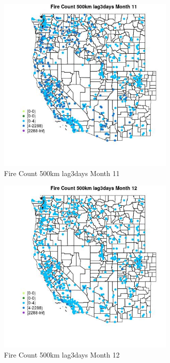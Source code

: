 \begin{figure} 
\centering  
\includegraphics[width=0.77\textwidth]{Code_Outputs/Report_ML_input_PM25_Step4_part_e_de_duplicated_aves_compiled_2019-05-21wNAs_MapObsMo11Fire_Count_500km_lag3days.jpg} 
\caption{\label{fig:Report_ML_input_PM25_Step4_part_e_de_duplicated_aves_compiled_2019-05-21wNAsMapObsMo11Fire_Count_500km_lag3days}Fire Count 500km lag3days Month 11} 
\end{figure} 
 

\begin{figure} 
\centering  
\includegraphics[width=0.77\textwidth]{Code_Outputs/Report_ML_input_PM25_Step4_part_e_de_duplicated_aves_compiled_2019-05-21wNAs_MapObsMo12Fire_Count_500km_lag3days.jpg} 
\caption{\label{fig:Report_ML_input_PM25_Step4_part_e_de_duplicated_aves_compiled_2019-05-21wNAsMapObsMo12Fire_Count_500km_lag3days}Fire Count 500km lag3days Month 12} 
\end{figure} 
 

